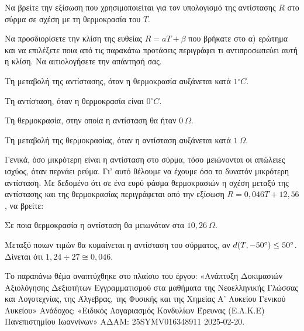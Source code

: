 \begin{alist}
\item Να βρείτε την εξίσωση που χρησιμοποιείται για τον υπολογισμό της αντίστασης $R$ στο σύρμα σε σχέση με τη θερμοκρασία του $T$.
\item Να προσδιορίσετε την κλίση της ευθείας $R = a T + \beta$ που βρήκατε στο α) ερώτημα και να επιλέξετε ποια από τις παρακάτω προτάσεις περιγράφει τι αντιπροσωπεύει αυτή η κλίση. Να αιτιολογήσετε την απάντησή σας.

\begin{rlist}
\item Τη μεταβολή της αντίστασης, όταν η θερμοκρασία αυξάνεται κατά $1{^\circ}C$.

\item Τη αντίσταση, όταν η θερμοκρασία είναι $0{^\circ}C$.

\item Τη θερμοκρασία, στην οποία η αντίσταση θα ήταν $0\ \Omega$.

\item Τη μεταβολή της θερμοκρασίας, όταν η αντίσταση αυξάνεται κατά $1\ \Omega$.
\end{rlist}
\item Γενικά, όσο μικρότερη είναι η αντίσταση στο σύρμα, τόσο μειώνονται οι απώλειες ισχύος, όταν περνάει ρεύμα. Γι' αυτό θέλουμε να έχουμε όσο το δυνατόν μικρότερη αντίσταση. Με δεδομένο ότι σε ένα ευρύ φάσμα θερμοκρασιών η σχέση μεταξύ της αντίστασης και της θερμοκρασίας περιγράφεται από την εξίσωση $R = 0,046T + 12,56$, να βρείτε:

\begin{rlist}
\item Σε ποια θερμοκρασία η αντίσταση θα μειωνόταν στα $10,26\ \Omega$.
\item Μεταξύ ποιων τιμών θα κυμαίνεται η αντίσταση του σύρματος, αν $d(T, - 50\degree) \leq 50\degree$.
Δίνεται ότι $1,24 \div 27 \cong 0,046$.

{\footnotesize Το παραπάνω θέμα αναπτύχθηκε στο πλαίσιο του έργου: «Ανάπτυξη Δοκιμασιών Αξιολόγησης Δεξιοτήτων Εγγραμματισμού στα μαθήματα της Νεοελληνικής Γλώσσας και Λογοτεχνίας, της Άλγεβρας, της Φυσικής και της Χημείας Α' Λυκείου Γενικού Λυκείου» Ανάδοχος: «Ειδικός Λογαριασμός Κονδυλίων Έρευνας (Ε.Λ.Κ.Ε) Πανεπιστημίου Ιωαννίνων» ΑΔΑΜ: 25SYMV016348911 2025-02-20.}
\end{rlist}
\end{alist}

